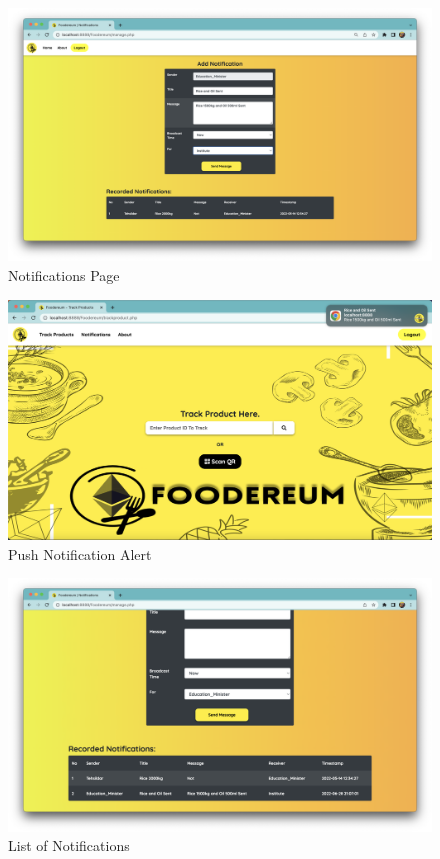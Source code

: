 \documentclass[12pt,a4paper,twocolumn,fleqn]{article}
\begin{document}
\begin{figure} [H]
\includegraphics[width=15cm]{media/Notification.png}
\centering
\caption{Notifications Page}
\end{figure}
\begin{figure} [H]
\includegraphics[width=15cm]{media/Notif_Received.png}
\centering
\caption{Push Notification Alert}
\end{figure}
\begin{figure} [H]
\includegraphics[width=15cm]{media/Notif_List.png}
\centering
\caption{List of Notifications}
\end{figure}
\end{document}
